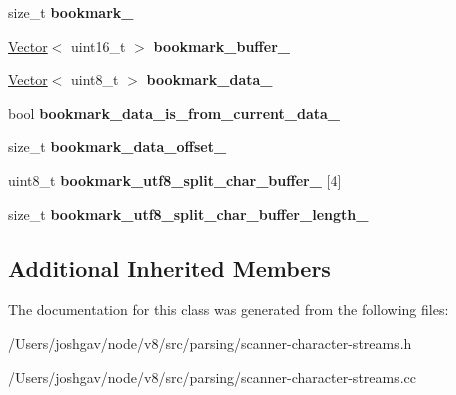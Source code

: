 \begin{DoxyCompactItemize}
\item 
size\+\_\+t {\bfseries bookmark\+\_\+}\hypertarget{classv8_1_1internal_1_1_external_streaming_stream_a29db2052e514867a54439746d0b516aa}{}\label{classv8_1_1internal_1_1_external_streaming_stream_a29db2052e514867a54439746d0b516aa}

\item 
\hyperlink{classv8_1_1internal_1_1_vector}{Vector}$<$ uint16\+\_\+t $>$ {\bfseries bookmark\+\_\+buffer\+\_\+}\hypertarget{classv8_1_1internal_1_1_external_streaming_stream_a0baca8316446f6457b9922ace8eed514}{}\label{classv8_1_1internal_1_1_external_streaming_stream_a0baca8316446f6457b9922ace8eed514}

\item 
\hyperlink{classv8_1_1internal_1_1_vector}{Vector}$<$ uint8\+\_\+t $>$ {\bfseries bookmark\+\_\+data\+\_\+}\hypertarget{classv8_1_1internal_1_1_external_streaming_stream_a8155720a21c405465ffb1ce50ac189e7}{}\label{classv8_1_1internal_1_1_external_streaming_stream_a8155720a21c405465ffb1ce50ac189e7}

\item 
bool {\bfseries bookmark\+\_\+data\+\_\+is\+\_\+from\+\_\+current\+\_\+data\+\_\+}\hypertarget{classv8_1_1internal_1_1_external_streaming_stream_aa198c922d820cb093d296dc2f18c850a}{}\label{classv8_1_1internal_1_1_external_streaming_stream_aa198c922d820cb093d296dc2f18c850a}

\item 
size\+\_\+t {\bfseries bookmark\+\_\+data\+\_\+offset\+\_\+}\hypertarget{classv8_1_1internal_1_1_external_streaming_stream_ad09c45dac7b0ada4c23d1ebbdd3823a0}{}\label{classv8_1_1internal_1_1_external_streaming_stream_ad09c45dac7b0ada4c23d1ebbdd3823a0}

\item 
uint8\+\_\+t {\bfseries bookmark\+\_\+utf8\+\_\+split\+\_\+char\+\_\+buffer\+\_\+} \mbox{[}4\mbox{]}\hypertarget{classv8_1_1internal_1_1_external_streaming_stream_a1ef91e071e3aaf0c7251780481477f1a}{}\label{classv8_1_1internal_1_1_external_streaming_stream_a1ef91e071e3aaf0c7251780481477f1a}

\item 
size\+\_\+t {\bfseries bookmark\+\_\+utf8\+\_\+split\+\_\+char\+\_\+buffer\+\_\+length\+\_\+}\hypertarget{classv8_1_1internal_1_1_external_streaming_stream_ade49d40c8ba94a70e9514ee241794ad4}{}\label{classv8_1_1internal_1_1_external_streaming_stream_ade49d40c8ba94a70e9514ee241794ad4}

\end{DoxyCompactItemize}
\subsection*{Additional Inherited Members}


The documentation for this class was generated from the following files\+:\begin{DoxyCompactItemize}
\item 
/\+Users/joshgav/node/v8/src/parsing/scanner-\/character-\/streams.\+h\item 
/\+Users/joshgav/node/v8/src/parsing/scanner-\/character-\/streams.\+cc\end{DoxyCompactItemize}
